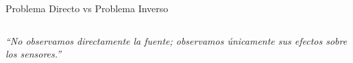 \begin{frame}{Problema Directo vs Problema Inverso}
\begin{columns}[T]
    \end{columns}
    
    \vspace{0.2cm}
    
    \begin{center}
        \small \textit{“No observamos directamente la fuente; observamos únicamente sus efectos sobre los sensores.”}
    \end{center}
    
\end{frame}